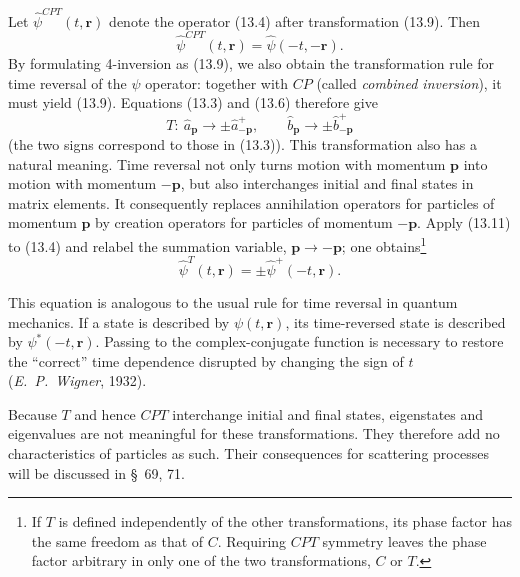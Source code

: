 Let $\widehat\psi^{CPT}(t,\mathbf{r})$ denote the operator (13.4) after transformation (13.9). Then
\begin{equation}
\widehat\psi^{CPT}(t,\mathbf{r})=\widehat\psi(-t,-\mathbf{r}).
\tag{13.10}
\end{equation}
By formulating 4-inversion as (13.9), we also obtain the transformation rule for time reversal of the $\psi$ operator: together with $CP$ (called \emph{combined inversion}), it must yield (13.9). Equations (13.3) and (13.6) therefore give
\begin{equation}
T:\ \widehat a_{\mathbf{p}}\to\pm\widehat a^+_{-\mathbf{p}},
\qquad
\widehat b_{\mathbf{p}}\to\pm\widehat b^+_{-\mathbf{p}}
\tag{13.11}
\end{equation}
(the two signs correspond to those in (13.3)). This transformation also has a natural meaning. Time reversal not only turns motion with momentum $\mathbf{p}$ into motion with momentum $-\mathbf{p}$, but also interchanges initial and final states in matrix elements. It consequently replaces annihilation operators for particles of momentum $\mathbf{p}$ by creation operators for particles of momentum $-\mathbf{p}$. Apply (13.11) to (13.4) and relabel the summation variable, $\mathbf{p}\to-\mathbf{p}$; one obtains\footnote{If $T$ is defined independently of the other transformations, its phase factor has the same freedom as that of $C$. Requiring $CPT$ symmetry leaves the phase factor arbitrary in only one of the two transformations, $C$ or $T$.}
\begin{equation}
\widehat\psi^T(t,\mathbf{r})=\pm\widehat\psi^+(-t,\mathbf{r}).
\tag{13.12}
\end{equation}

This equation is analogous to the usual rule for time reversal in quantum mechanics. If a state is described by $\psi(t,\mathbf{r})$, its time-reversed state is described by $\psi^*(-t,\mathbf{r})$. Passing to the complex-conjugate function is necessary to restore the ``correct'' time dependence disrupted by changing the sign of $t$ (\emph{E.~P.~Wigner}, 1932).

Because $T$ and hence $CPT$ interchange initial and final states, eigenstates and eigenvalues are not meaningful for these transformations. They therefore add no characteristics of particles as such. Their consequences for scattering processes will be discussed in \S~69, 71.

